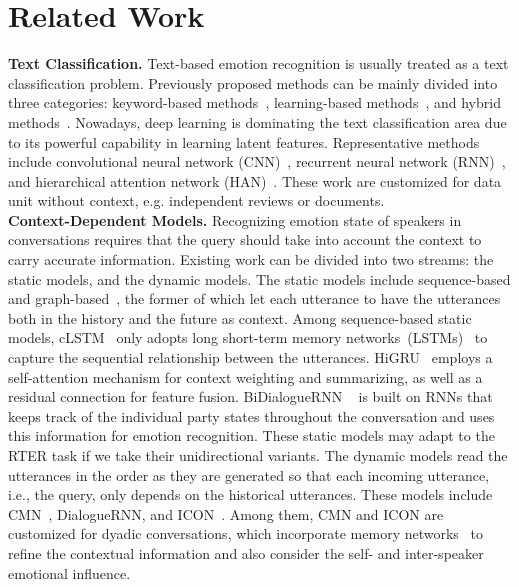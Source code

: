\documentclass[letterpaper]{article} %
\begin{document}
\section{Related Work}

\noindent\textbf{Text Classification.}
Text-based emotion recognition is usually treated as a text classification problem. Previously proposed methods can be mainly divided into three categories: keyword-based methods~\cite{DBLP:conf/aaai/WilsonWH04}, learning-based methods~\cite{DBLP:conf/webi/YangLC07}, and hybrid methods~\cite{DBLP:journals/talip/WuCL06}. 
Nowadays, deep learning is dominating the text classification area due to its powerful capability in learning latent features. Representative methods include convolutional neural network (CNN)~\cite{DBLP:conf/emnlp/Kim14}, recurrent neural network (RNN)~\cite{DBLP:conf/acl/Abdul-MageedU17}, and hierarchical attention network (HAN)~\cite{DBLP:conf/emnlp/TangQL15}. These work are customized for data unit without context, e.g. independent reviews or documents.
\\[1ex]
\noindent\textbf{Context-Dependent Models.}
Recognizing emotion state of speakers in conversations requires that the query should take into account the context to carry accurate information. Existing work can be divided into two streams: the static models, and the dynamic models. The static models include sequence-based and graph-based~\cite{DBLP:conf/ijcai/ZhangWSLZZ19,DBLP:journals/corr/abs-1908-11540}, the former of which let each utterance to have the utterances both in the history and the future as context. Among sequence-based static models, cLSTM~\cite{DBLP:conf/acl/PoriaCHMZM17} only adopts long short-term memory networks~(LSTMs)~\cite{DBLP:journals/neco/HochreiterS97} to capture the sequential relationship between the utterances. HiGRU~\cite{DBLP:conf/naacl/JiaoYKL19} employs a self-attention mechanism for context weighting and summarizing, as well as a residual connection for feature fusion. BiDialogueRNN ~\cite{DBLP:conf/aaai/MajumderPHMGC19} is built on RNNs that keeps track of the individual party states throughout the conversation and uses this information for emotion recognition. These static models may adapt to the RTER task if we take their unidirectional variants. The dynamic models read the utterances in the order as they are generated so that each incoming utterance, i.e., the query, only depends on the historical utterances. These models include CMN~\cite{DBLP:conf/naacl/HazarikaPZCMZ18}, DialogueRNN, and ICON~\cite{DBLP:conf/emnlp/HazarikaPMCZ18}. Among them, CMN and ICON are customized for dyadic conversations, which incorporate memory networks~\cite{DBLP:conf/nips/SukhbaatarSWF15} to refine the contextual information and also consider the self- and inter-speaker emotional influence. 
\end{document}
